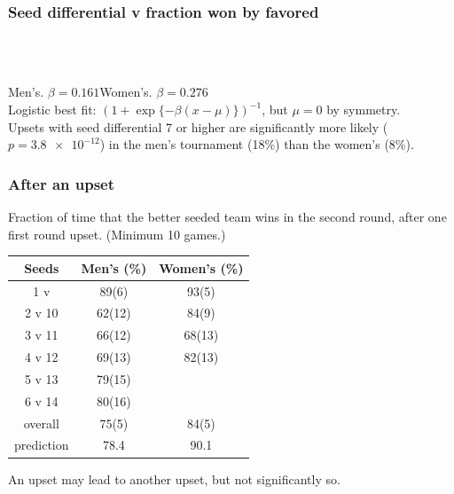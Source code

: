 \documentclass{beamer}
\begin{document}
\begin{frame}
\frametitle{Seed differential v fraction won by favored}
{}%
~
{}%
\\\medskip
\hfill Men's. $\beta=0.161$\hfill Women's. $\beta=0.276$\hfill\null\\
Logistic best fit: $(1+\exp\{-\beta(x-\mu)\})^{-1}$, but $\mu=0$ by symmetry.\\
Upsets with seed differential 7 or higher are significantly more likely ($p=\num{3.8e-12}$) in the men's tournament (18\%) than the women's (8\%).
\end{frame}

\begin{frame}
\frametitle{After an upset}
Fraction of time that the better seeded team wins in the second round, after one first round upset.  (Minimum 10 games.)
\begin{center}
\begin{tabular}{ c *2{S[table-format=2(2), separate-uncertainty]} }\toprule
Seeds & {Men's (\%)} & {Women's (\%)} \\ v  & 89(6) & 93(5) \\
2 v 10 & 62(12) & 84(9) \\
3 v 11 & 66(12) & 68(13) \\
4 v 12 & 69(13) & 82(13) \\
5 v 13 & 79(15) \\
6 v 14 & 80(16) \\\addlinespace
overall & 75(5) & 84(5)\\
prediction & 78.4 & 90.1 \\\bottomrule
\end{tabular}
\end{center}
An upset may lead to another upset, but not significantly so.
\end{frame}
\end{document}
